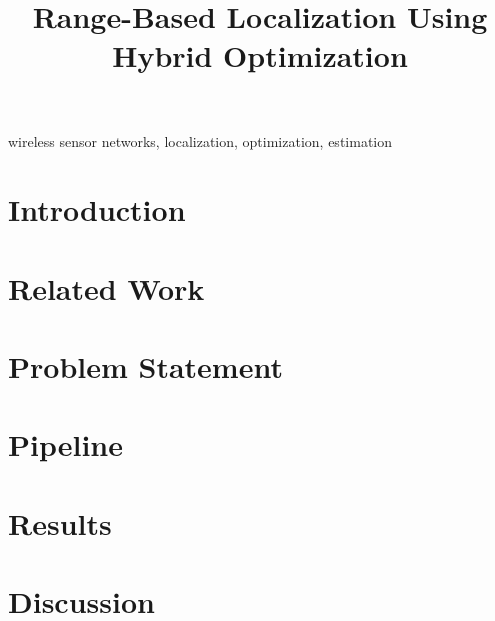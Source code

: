 \documentclass[conference]{IEEEtran}
\begin{document}
\title{Range-Based Localization Using Hybrid Optimization}

\author{
}

\maketitle

\begin{abstract}


\end{abstract}

\begin{IEEEkeywords}
wireless sensor networks, localization, optimization, estimation
\end{IEEEkeywords}

\section{Introduction}
\label{sec:intro}


\section{Related Work}
\label{sec:related-work}


\section{Problem Statement}
\label{sec:prob-statement}



\section{Pipeline}
\label{sec:pipeline}


\section{Results}



\section{Discussion}



\printbibliography
\end{document}
